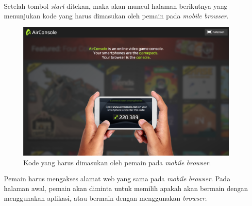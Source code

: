 Setelah tombol \textit{start} ditekan, maka akan muncul halaman berikutnya yang menunjukan kode yang harus dimasukan oleh pemain pada \textit{mobile browser}. 

\begin{figure}[H]
	\centering
	\includegraphics[scale=0.2]{Gambar/con2_code1}
	\caption{Kode yang harus dimasukan oleh pemain pada \textit{mobile browser}.}
	\label{fig:17_con2_code1}
\end{figure}

Pemain harus mengakses alamat web yang sama pada \textit{mobile browser}. Pada halaman awal, pemain akan diminta untuk memilih apakah akan bermain dengan menggunakan aplikasi, atau bermain dengan menggunakan \textit{browser}. 

